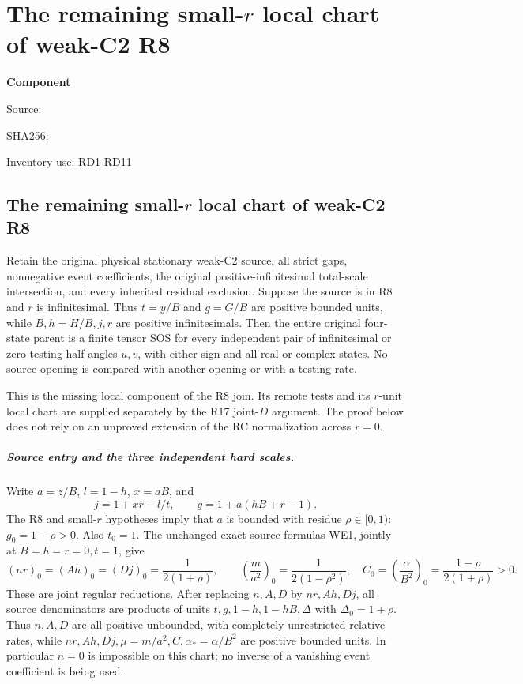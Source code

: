\chapter{The remaining small-$r$ local chart of weak-C2 R8}
\label{component:p482fcad1a2e2}
\noindent\textbf{Component }\par
{\small\noindent Source: \par}
{\small\noindent SHA256: \par}
{\small\noindent Inventory use: RD1-RD11\par}
\medskip
\section{The remaining small-$r$ local chart of weak-C2 R8}
\label{p482fcad1a2e2:sec:r17-r8-small-r}

\begin{theorem}
Retain the original physical stationary weak-C2 source, all strict gaps,
nonnegative event coefficients, the original positive-infinitesimal
total-scale intersection, and every inherited residual exclusion.
Suppose the source is in R8 and $r$ is infinitesimal. Thus $t=y/B$
and $g=G/B$ are positive bounded units, while $B,h=H/B,j,r$ are
positive infinitesimals. Then the entire original four-state parent is
a finite tensor SOS for every independent pair of infinitesimal or zero
testing half-angles $u,v$, with either sign and all real or complex states.
No source opening is compared with another opening or with a testing rate.
\end{theorem}

This is the missing local component of the R8 join. Its remote tests
and its $r$-unit local chart are supplied separately by the R17
joint-$D$ argument. The proof below does not rely on an unproved
extension of the RC normalization across $r=0$.

\paragraph{Source entry and the three independent hard scales.}
Write $a=z/B$, $l=1-h$, $x=aB$, and
\[
 j=1+xr-l/t,\qquad g=1+a(hB+r-1).
\]
The R8 and small-$r$ hypotheses imply that $a$ is bounded with residue
$\rho\in[0,1)$: $g_0=1-\rho>0$. Also $t_0=1$.
The unchanged exact source formulas WE1, jointly at $B=h=r=0,t=1$,
give
\[
 (nr)_0=(Ah)_0=(Dj)_0=\frac1{2(1+\rho)},\qquad
 \left(\frac{m}{a^2}\right)_0=\frac1{2(1-\rho^2)},
 \quad C_0=\left(\frac\alpha{B^2}\right)_0
       =\frac{1-\rho}{2(1+\rho)}>0.                 \tag{RD1}
\]
These are joint regular reductions. After replacing $n,A,D$ by
$nr,Ah,Dj$, all source denominators are products of units
$t,g,1-h,1-hB,\Delta$ with $\Delta_0=1+\rho$.
Thus $n,A,D$ are all positive unbounded, with completely unrestricted
relative rates, while $nr,Ah,Dj,\mu=m/a^2,C,\alpha_*=\alpha/B^2$
are positive bounded units. In particular $n=0$ is impossible on
this chart; no inverse of a vanishing event coefficient is being used.

